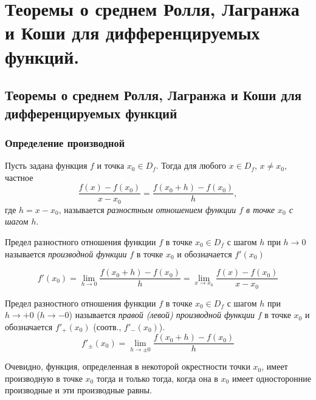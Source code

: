 \chapter{Теоремы о среднем Ролля, Лагранжа и Коши для дифференцируемых функций.}


\section{Теоремы о среднем Ролля, Лагранжа и Коши для дифференцируемых функций}

\subsection{Определение производной}

Пусть задана функция $f$ и точка $x_0\in D_f$. Тогда для любого $x \in D_f$, $x\ne x_0$, частное
\begin{equation}\label{ya3e1}
\frac{f(x)-f(x_0)}{x-x_0}=\frac{f(x_0+h)-f(x_0)}{h}, 
\end{equation}
где $h=x-x_0$, называется \textit{разностным отношением функции $f$ в точке $x_0$ с шагом $h$}.

\begin{defn}
\label{ya3d1}
Предел разностного отношения функции $f$ в точке $x_0 \in D_f$ с шагом $h$ при $h \to 0$ называется \textit{производной функции} $f$ в точке $x_0$ и обозначается $f'(x_0)$

\begin{equation}\label{ya3e2}
f'(x_0)=\lim_{h\to 0}\limits\frac{f(x_0+h)-f(x_0)}{h}=\lim_{x\to x_0}\limits \frac{f(x)-f(x_0)}{x-x_0}
\end{equation}

\end{defn}
\begin{defn} Предел разностного отношения функции $f$ в точке $x_0 \in D_f$ с шагом $h$ при $h \to +0 $ ($h \to -0$) называется \textit{правой (левой) производной функции} $f$ в точке $x_0$ и обозначается $f'_+(x_0)$ (соотв., $f'_-(x_0)$).
\begin{equation}\label{ya3e3}
f'_\pm(x_0)=\lim_{h\to \pm0}\limits\frac{f(x_0+h)-f(x_0)}{h}
\end{equation}
\end{defn}

Очевидно, функция, определенная в некоторой окрестности точки $x_0$, имеет производную в точке $x_0$ тогда и только тогда, когда она в $x_0$ имеет односторонние производные и эти производные равны.


